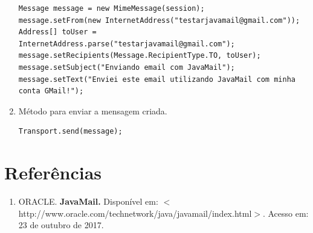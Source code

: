 \documentclass[14pt, a4paper]{article}
\begin{document}
\begin{enumerate}
\begin{lstlisting}
Message message = new MimeMessage(session);
message.setFrom(new InternetAddress("testarjavamail@gmail.com"));
Address[] toUser = InternetAddress.parse("testarjavamail@gmail.com");  
message.setRecipients(Message.RecipientType.TO, toUser);
message.setSubject("Enviando email com JavaMail");
message.setText("Enviei este email utilizando JavaMail com minha conta GMail!");

\end{lstlisting}                    

\item Método para enviar a mensagem criada.

\begin{lstlisting}
Transport.send(message);
\end{lstlisting}                                        

\end{enumerate}

\section{Referências}
\begin{enumerate}

\item ORACLE. \textbf{JavaMail.} Disponível em: $<$http://www.oracle.com/technetwork/java/javamail/index.html$>$. Acesso em: 23 de outubro de 2017.

\end{enumerate}
\end{document}
